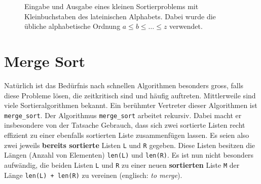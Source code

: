 \begin{figure}[H]
	\def\lvld{1.2}                  %
	\pgfmathsetmacro\shft{-6*\lvld} %
	\centering
	\caption{Eingabe und Ausgabe eines kleinen Sortierproblems mit Kleinbuchstaben des lateinischen Alphabets. Dabei wurde die übliche alphabetische Ordnung $a\leq b\leq \ldots \leq z$ verwendet.}
	\label{fig:bsp2}
\end{figure}

\section{Merge Sort}
Natürlich ist das Bedürfnis nach schnellen Algorithmen besonders gross, falls diese Probleme lösen, die zeitkritisch sind und häufig auftreten. Mittlerweile sind viele Sortieralgorithmen bekannt. Ein berühmter Vertreter dieser Algorithmen ist \lstinline{merge_sort}. Der Algorithmus \lstinline{merge_sort} arbeitet rekursiv. Dabei macht er insbesondere von der Tatsache Gebrauch, dass sich zwei sortierte Listen recht effizient zu einer ebenfalls sortierten Liste zusammenfügen lassen. Es seien also zwei jeweils \textbf{bereits sortierte} Listen \lstinline|L| und \lstinline|R| gegeben. Diese Listen besitzen die Längen (Anzahl von Elementen) \lstinline|len(L)| und \lstinline|len(R)|. Es ist nun nicht besonders aufwändig, die beiden Listen \lstinline|L| und \lstinline|R| zu einer neuen \textbf{sortierten} Liste \lstinline|M| der Länge \lstinline|len(L) + len(R)| zu vereinen (englisch: \textit{to merge}).

